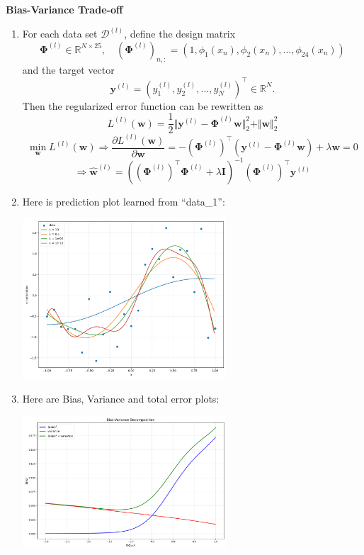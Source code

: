 \documentclass[11pt,letter,notitlepage]{article}
\begin{document}
\newpage

\begin{solution} \textbf{Bias-Variance Trade-off}
\begin{enumerate}
	\item
	For each data set $\mathcal{D}^{(l)}$, define the design matrix
	\[
	\mathbf{\Phi}^{(l)}
	\in
	\mathbb{R}^{N \times 25},
	\quad
	(\mathbf{\Phi}^{(l)})_{n,:}
	=
	(1, \phi_1(x_n), \phi_2(x_n), \dots, \phi_{24}(x_n))
	\]
	and the target vector
	\[
	\mathbf{y}^{(l)}
	=
	(y_1^{(l)}, y_2^{(l)}, \dots, y_N^{(l)})^\top
	\in
	\mathbb{R}^N.
	\]
	Then the regularized error function can be rewritten as
	\[
	L^{(l)}(\mathbf{w})
	=
	\frac{1}{2}
	\Vert
	\mathbf{y}^{(l)}
	-
	\mathbf{\Phi}^{(l)} \mathbf{w}
	\Vert_2^2
	+
	\Vert
	\mathbf{w}
	\Vert_2^2
	\]
	\[
	\min_{\mathbf{w}} L^{(l)}(\mathbf{w})
	\Longrightarrow
	\frac{\partial L^{(l)}(\mathbf{w})}{\partial \mathbf{w}}
	=
	-
	(\mathbf{\Phi}^{(l)})^\top
	(
	\mathbf{y}^{(l)}
	-
	\mathbf{\Phi}^{(l)} \mathbf{w}
	)
	+
	\lambda \mathbf{w}
	=
	0
	\]
	\[
	\Longrightarrow
	\hat{\mathbf{w}}^{(l)}
	=
	\left(
	(\mathbf{\Phi}^{(l)})^\top \mathbf{\Phi}^{(l)}
	+
	\lambda \mathbf{I}
	\right)^{-1}
	(\mathbf{\Phi}^{(l)})^\top \mathbf{y}^{(l)}
	\]
	\item 
	Here is prediction plot learned from ``data\_1'':
	\begin{center}
    	\includegraphics[width=0.6\textwidth]{./Figure/7-2.png}
    	\label{fig:prediction-plots}
	\end{center}
	\item 
	Here are Bias, Variance and total error plots:
	\begin{center}
		\includegraphics[width=0.6\textwidth]{./Figure/7-3.png}
		\label{fig:error-plots}
	\end{center}
\end{enumerate}
\end{solution}
\end{document}
